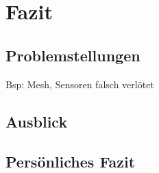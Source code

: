 \chapter{Fazit}

\section{Problemstellungen}
Bsp: Mesh, Sensoren falsch verlötet

\section{Ausblick}

\section{Persönliches Fazit}